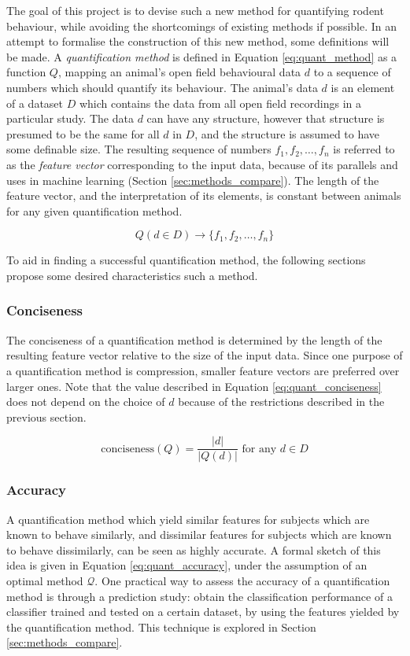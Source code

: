 \documentclass[conference,a4paper,twoside]{IEEEtran}
\begin{document}
The goal of this project is to devise such a new method for quantifying rodent behaviour, while avoiding the shortcomings of existing methods if possible. In an attempt to formalise the construction of this new method, some definitions will be made. A \emph{quantification method} is defined in Equation \ref{eq:quant_method} as a function $Q$, mapping an animal's open field behavioural data $d$ to a sequence of numbers which should quantify its behaviour. The animal's data $d$ is an element of a dataset $D$ which contains the data from all open field recordings in a particular study. The data $d$ can have any structure, however that structure is presumed to be the same for all $d$ in $D$, and the structure is assumed to have some definable size. The resulting sequence of numbers $f_1, f_2, \dots, f_n$ is referred to as the \emph{feature vector} corresponding to the input data, because of its parallels and uses in machine learning (Section \ref{sec:methods_compare}). The length of the feature vector, and the interpretation of its elements, is constant between animals for any given quantification method.

\begin{equation} \label{eq:quant_method}
    Q(d \in D) \rightarrow \{ f_1, f_2, \dots, f_n \}
\end{equation}

To aid in finding a successful quantification method, the following sections propose some desired characteristics such a method.

\subsubsection{Conciseness}
\label{sec:bg_concise}
The conciseness of a quantification method is determined by the length of the resulting feature vector relative to the size of the input data. Since one purpose of a quantification method is compression, smaller feature vectors are preferred over larger ones. Note that the value described in Equation \ref{eq:quant_conciseness} does not depend on the choice of $d$ because of the restrictions described in the previous section.

\begin{equation} \label{eq:quant_conciseness}
    \text{conciseness}(Q) = \frac{|d|}{|Q(d)|} \text{ for any $d \in D$}
\end{equation}

\subsubsection{Accuracy}
A quantification method which yield similar features for subjects which are known to behave similarly, and dissimilar features for subjects which are known to behave dissimilarly, can be seen as highly accurate. A formal sketch of this idea is given in Equation \ref{eq:quant_accuracy}, under the assumption of an optimal method $\mathscr{Q}$. One practical way to assess the accuracy of a quantification method is through a prediction study: obtain the classification performance of a classifier trained and tested on a certain dataset, by using the features yielded by the quantification method. This technique is explored in Section \ref{sec:methods_compare}.
\end{document}
